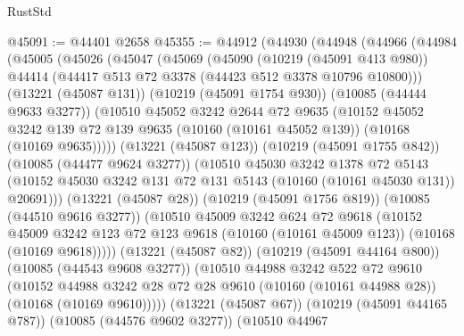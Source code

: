 \begin{lexlean}{RustStd}
\begin{coremodule}
@45091 := @44401 @2658
@45355 := @44912
    (@44930
      (@44948
        (@44966
          (@44984
            (@45005
              (@45026
                (@45047
                  (@45069
                    (@45090
                      (@10219 (@45091 @413 @980))
                      @44414
                      (@44417 @513 @72 @3378 (@44423 @512 @3378 @10796 @10800)))
                    (@13221 (@45087 @131))
                    (@10219 (@45091 @1754 @930))
                    (@10085 (@44444 @9633 @3277))
                    (@10510
                      @45052
                      @3242
                      @2644
                      @72
                      @9635
                      (@10152
                        @45052
                        @3242
                        @139
                        @72
                        @139
                        @9635
                        (@10160 (@10161 @45052 @139))
                        (@10168 (@10169 @9635)))))
                  (@13221 (@45087 @123))
                  (@10219 (@45091 @1755 @842))
                  (@10085 (@44477 @9624 @3277))
                  (@10510
                    @45030
                    @3242
                    @1378
                    @72
                    @5143
                    (@10152 @45030 @3242 @131 @72 @131 @5143 (@10160 (@10161 @45030 @131)) @20691)))
                (@13221 (@45087 @28))
                (@10219 (@45091 @1756 @819))
                (@10085 (@44510 @9616 @3277))
                (@10510
                  @45009
                  @3242
                  @624
                  @72
                  @9618
                  (@10152
                    @45009
                    @3242
                    @123
                    @72
                    @123
                    @9618
                    (@10160 (@10161 @45009 @123))
                    (@10168 (@10169 @9618)))))
              (@13221 (@45087 @82))
              (@10219 (@45091 @44164 @800))
              (@10085 (@44543 @9608 @3277))
              (@10510
                @44988
                @3242
                @522
                @72
                @9610
                (@10152
                  @44988
                  @3242
                  @28
                  @72
                  @28
                  @9610
                  (@10160 (@10161 @44988 @28))
                  (@10168 (@10169 @9610)))))
            (@13221 (@45087 @67))
            (@10219 (@45091 @44165 @787))
            (@10085 (@44576 @9602 @3277))
            (@10510
              @44967

\end{coremodule}
\end{lexlean}
